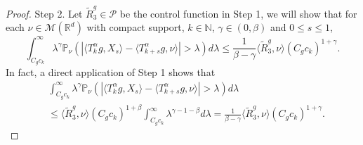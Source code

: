 \documentclass[12pt, a4paper]{amsart}
\theoremstyle{definition}
\numberwithin{equation}{section}
\begin{document}
\begin{proof}
    Step 2. Let $\tilde R^g_3\in \mathcal P$ be the control function in Step 1, we will show that for each $\nu\in \mathcal M(\mathbb R^d)$ with compact support, $k\in \mathbb N$, $\gamma \in (0,\beta)$ and $0\leq s \leq 1$,
\[
    \int_{C_g c_k}^\infty \lambda^{\gamma} \mathbb P_\nu(|\langle T_k^\alpha g,X_s\rangle - \langle T_{k+s}^\alpha g, \nu\rangle|> \lambda) d\lambda
    \leq \frac{1}{\beta-\gamma} \langle \tilde R^g_3,\nu\rangle (C_g c_k)^{1+\gamma}.
\]
    In fact, a direct application of Step 1 shows that
\begin{align}
    &\int_{C_g c_k}^\infty \lambda^{\gamma} \mathbb P_\nu(|\langle T_k^\alpha g,X_s\rangle - \langle T_{k+s}^\alpha g, \nu\rangle|> \lambda) d\lambda
    \\&\leq \langle \tilde R^g_3,\nu \rangle (C_g c_k)^{1+\beta}\int_{C_g c_k}^\infty \lambda^{\gamma-1-\beta}d\lambda
    = \frac{1}{\beta-\gamma}\langle \tilde R^g_3,\nu \rangle (C_g c_k)^{1+\gamma}.
\end{align}


\end{proof}
\end{document}

